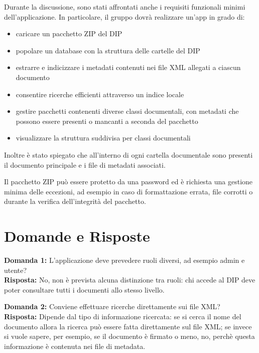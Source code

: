 \documentclass[a4paper,12pt]{article}
\begin{document}
Durante la discussione, sono stati affrontati anche i requisiti funzionali minimi dell’applicazione.
In particolare, il gruppo dovrà realizzare un’app in grado di:
\begin{itemize}
\item caricare un pacchetto ZIP del DIP
\item popolare un database con la struttura delle cartelle del DIP
\item estrarre e indicizzare i metadati contenuti nei file XML allegati a ciascun documento
\item consentire ricerche efficienti attraverso un indice locale
\item gestire pacchetti contenenti diverse classi documentali, con metadati che possono essere presenti o mancanti a seconda del pacchetto
\item visualizzare la struttura suddivisa per classi documentali
\end{itemize}
\vspace{0.5cm}

Inoltre è stato spiegato che all’interno di ogni cartella documentale sono presenti il documento principale e i file di metadati associati.

Il pacchetto ZIP può essere protetto da una password ed è richiesta una gestione minima delle eccezioni, ad esempio in caso di formattazione errata, file corrotti o durante la verifica dell’integrità del pacchetto.


\section{Domande e Risposte}
\textbf{Domanda 1:} L’applicazione deve prevedere ruoli diversi, ad esempio admin e utente? \\[0.5em]
\textbf{Risposta:} No, non è prevista alcuna distinzione tra ruoli: chi accede al DIP deve poter consultare tutti i documenti allo stesso livello.
\vspace{2em}

\textbf{Domanda 2:} Conviene effettuare ricerche direttamente sui file XML? \\[0.5em]
\textbf{Risposta:} Dipende dal tipo di informazione ricercata: se si cerca il nome del documento allora la ricerca può essere fatta direttamente sul file XML; se invece si vuole sapere, per esempio, se il documento è firmato o meno, no, perchè questa informazione è contenuta nei file di metadata.
\vspace{2em}
\end{document}
